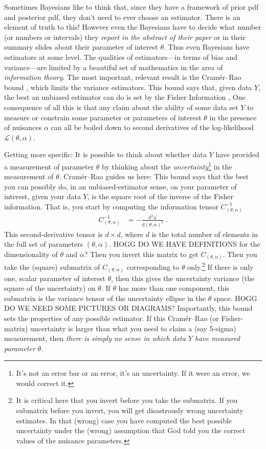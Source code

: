 \documentclass{article}
\newcommand{\dd}{\mathrm{d}}
\begin{document}
Sometimes Bayesians like to think that, since they have a framework of prior pdf and posterior pdf, they don't need to ever choose an estimator.
There is an element of truth to this!
However even the Bayesians have to decide what number (or numbers or intervals) they \emph{report in the abstract of their paper} or in their summary slides about their parameter of interest $\theta$.
Thus even Bayesians have estimators at some level.
The qualities of estimators---in terms of bias and variance---are limited by a beautiful set of mathematics in the area of \emph{information theory}.
The most important, relevant result is the Cram\'er--Rao bound \cite{cramer, rao}, which limits the variance estimators.
This bound says that, given data $Y$, the best an unbiased estimator can do is set by the Fisher Information \cite{fisher},
One consequence of all this is that any claim about the ability of some data set $Y$ to measure or constrain some parameter or parameters of interest $\theta$ in the presence of nuisances $\alpha$ can all be boiled down to second derivatives of the log-likelihood $\mathscr{L}(\theta,\alpha)$.

Getting more specific:
It is possible to think about whether data $Y$ have provided a measurement of parameter $\theta$ by thinking about the \emph{uncertainty}\footnote{%
It's not an error bar or an error, it's an uncertainty. If it were an error, we would correct it.}
in the measurement of $\theta$.
Cram\'er--Rao guides us here:
This bound says that the best you can possibly do, in an unbiased-estimator sense, on your parameter of interest, given your data $Y$, is the square root of the inverse of the Fisher information.
That is, you start by computing the information tensor $C^{-1}_{(\theta,\alpha)}$
\begin{align}
    C^{-1}_{(\theta,\alpha)} &= - \frac{\dd^2\mathscr{L}}{\dd(\theta,\alpha)^2} ~.\label{eq:fisher}
\end{align}
This second-derivative tensor is $d\times d$, where $d$ is the total number of elements in the full set of parameters $(\theta,\alpha)$.
HOGG DO WE HAVE DEFINITIONS for the dimensionality of $\theta$ and $\alpha$?
Then you invert this matrix to get $C_{(\theta,\alpha)}$.
Then you take the (square) submatrix of $C_{(\theta,\alpha)}$ corresponding to $\theta$ only.\footnote{It is critical here that you invert before you take the submatrix. If you submatrix before you invert, you will get disastrously wrong uncertainty estimates. In that (wrong) case you have computed the best possible uncertainty under the (wrong) assumption that God told you the correct values of the nuisance parameters.}
If there is only one, scalar parameter of interest $\theta$, then this gives the uncertainty variance (the square of the uncertainty) on $\theta$.
If $\theta$ has more than one component, this submatrix is the variance tensor of the uncertainty ellipse in the $\theta$ space.
HOGG DO WE NEED SOME PICTURES OR DIAGRAMS?
Importantly, this bound sets the properties of any possible estimator.
If this Cram\'er--Rao (or Fisher-matrix) uncertainty is larger than what you need to claim a (say 5-sigma) measurement, then \emph{there is simply no sense in which data $Y$ have measured parameter $\theta$}.
\end{document}
